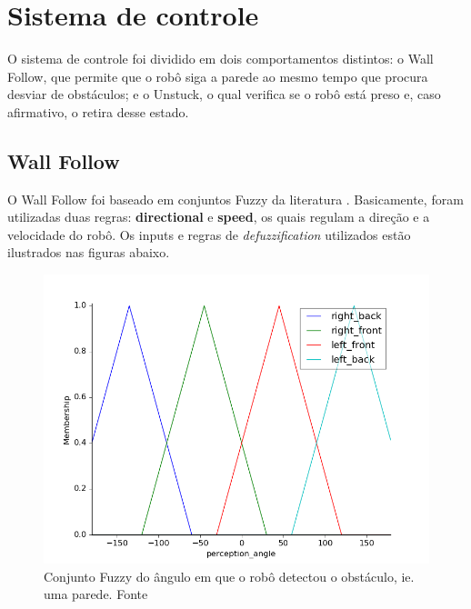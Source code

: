 \documentclass[twoside,conference,a4paper]{IEEEtran}
\begin{document}
\section{Sistema de controle}

O sistema de controle foi dividido em dois comportamentos distintos: o Wall Follow, que permite que o robô siga a parede ao mesmo tempo que procura desviar de obstáculos; e o Unstuck, o qual verifica se o robô está preso e, caso afirmativo, o retira desse estado.

\subsection{Wall Follow}

O Wall Follow foi baseado em conjuntos Fuzzy da literatura \cite{Reinhard:1995}. Basicamente, foram utilizadas duas regras: \textbf{directional} e \textbf{speed}, os quais regulam a direção e a velocidade do robô. Os inputs e regras de \textit{defuzzification} utilizados estão ilustrados nas figuras abaixo.

\begin{figure}[ht!]
  \centering
  \includegraphics[width=1\hsize]{figuras/per_angle.png}
  \caption{Conjunto Fuzzy do ângulo em que o robô detectou o obstáculo, ie. uma parede. Fonte \cite{Reinhard:1995}}
  \label{fig:fig1}
\end{figure}
\end{document}

